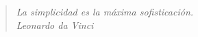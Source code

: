 \indent

\vfill


\begin{quote}
\begin{flushright}
	\textit{La simplicidad es la máxima sofisticación.}\\
	\textit{Leonardo da Vinci}
\end{flushright}
\end{quote}



\vfill
\cleardoublepage

\pagestyle{plain}
